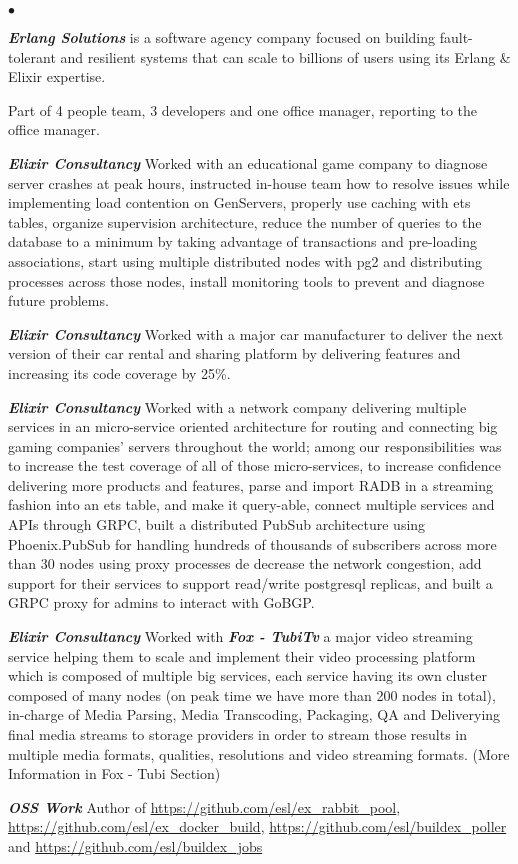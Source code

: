 \documentclass[a4paper]{article}
\newenvironment{achievements}{\begin{list}{$\bullet$}{\topsep 0pt \itemsep
  -2pt}}{\vspace*{4pt}\end{list}}
\newcommand{\emphasys}[1]{\textbf{\emph{#1}}}
\begin{document}
  \begin{achievements}
  \item \emphasys{Erlang Solutions} is a software agency company focused on building fault-tolerant and resilient systems that can scale to billions of users using its Erlang \& Elixir expertise.
  \item Part of 4 people team, 3 developers and one office manager, reporting to the office manager.
  \item \emphasys{Elixir Consultancy} Worked with an educational game company to diagnose server crashes at peak hours, instructed in-house team how to resolve issues while implementing load contention on GenServers, properly use caching with ets tables, organize supervision architecture, reduce the number of queries to the database to a minimum by taking advantage of transactions and pre-loading associations, start using multiple distributed nodes with pg2 and distributing processes across those nodes, install monitoring tools to prevent and diagnose future problems.
  \item \emphasys{Elixir Consultancy} Worked with a major car manufacturer to deliver the next version of their car rental and sharing platform by delivering features and increasing its code coverage by 25\%.
  \item \emphasys{Elixir Consultancy} Worked with a network company delivering multiple services in an micro-service oriented architecture for routing and connecting big gaming companies’ servers throughout the world; among our responsibilities was to increase the test coverage of all of those micro-services, to increase confidence delivering more products and features, parse and import RADB in a streaming fashion into an ets table, and make it query-able, connect multiple services and APIs through GRPC, built a distributed PubSub architecture using Phoenix.PubSub for handling hundreds of thousands of subscribers across more than 30 nodes using proxy processes de decrease the network congestion, add support for their services to support read/write postgresql replicas, and built a GRPC proxy for admins to interact with GoBGP.
  \item \emphasys{Elixir Consultancy} Worked with \emphasys{Fox - TubiTv} a major video streaming service helping them to scale and implement their video processing platform which is composed of multiple big services, each service having its own cluster composed of many nodes (on peak time we have more than 200 nodes in total), in-charge of Media Parsing, Media Transcoding, Packaging, QA and Deliverying final media streams to storage providers in order to stream those results in multiple media formats, qualities, resolutions and video streaming formats. (More Information in Fox - Tubi Section)
  \item \emphasys{OSS Work} Author of \url{https://github.com/esl/ex_rabbit_pool}, \url{https://github.com/esl/ex_docker_build}, \url{https://github.com/esl/buildex_poller} and \url{https://github.com/esl/buildex_jobs}
  \end{achievements}
\end{document}
